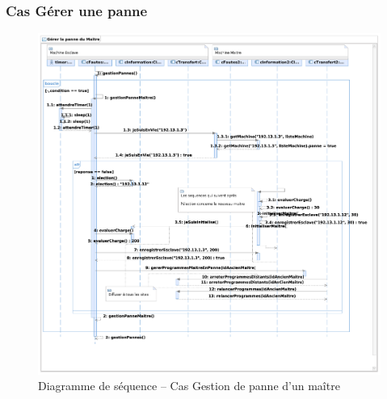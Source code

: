  \subsubsection{Cas Gérer une panne}

  \begin{figure}[h!]
    \centering
    \includegraphics[scale=0.4]{img/analyse_DSseqpanneMaitre.pdf}
    \caption{Diagramme de séquence -- Cas Gestion de panne d'un maître}
  \end{figure}
  

